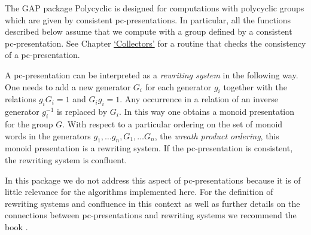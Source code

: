 \documentclass[a4paper,11pt]{report}
\begin{document}
{ The \textsf{GAP} package \textsf{Polycyclic} is designed for computations with polycyclic groups which are given by
consistent pc-presentations. In particular, all the functions described below
assume that we compute with a group defined by a consistent pc-presentation.
See Chapter \hyperref[Collectors]{`Collectors'} for a routine that checks the consistency of a pc-presentation. 

 A pc-presentation can be interpreted as a \emph{rewriting system} in the following way. One needs to add a new generator $G_i$ for each generator $g_i$ together with the relations $g_iG_i = 1$ and $G_ig_i = 1$. Any occurrence in a relation of an inverse generator $g_i^{-1}$ is replaced by $G_i$. In this way one obtains a monoid presentation for the group $G$. With respect to a particular ordering on the set of monoid words in the
generators $g_1,\ldots g_n,G_1,\ldots G_n$, the \emph{wreath product ordering}, this monoid presentation is a rewriting system. If the pc-presentation is
consistent, the rewriting system is confluent. 

 In this package we do not address this aspect of pc-presentations because it
is of little relevance for the algorithms implemented here. For the definition
of rewriting systems and confluence in this context as well as further details
on the connections between pc-presentations and rewriting systems we recommend
the book \cite{Sims94}. }

 
\end{document}
